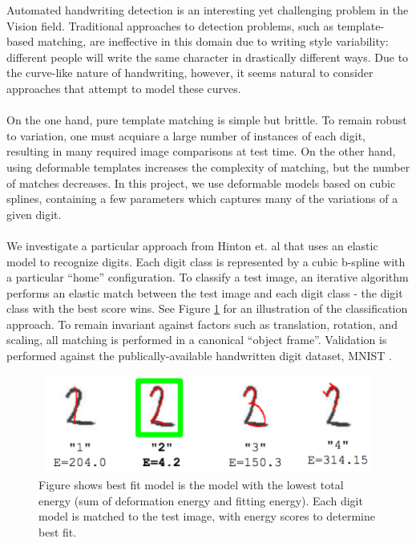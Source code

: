 \documentclass[oribibl]{llncs}
\begin{document}
Automated handwriting detection is an interesting yet challenging problem in the Vision field. Traditional approaches to detection problems, such as template-based matching, are ineffective in this domain due to writing style variability: different people will write the same character in drastically different ways. Due to the curve-like nature of handwriting, however, it seems natural to consider approaches that attempt to model these curves.  
\\
\\
On the one hand, pure template matching is simple but brittle. To remain robust to variation, one must acquiare a large number of instances of each digit, resulting in many required image comparisons at test time.
On the other hand, using deformable templates increases the complexity of matching, but the number of matches decreases. In this project, we use deformable models based on cubic splines, containing a few parameters which captures many of the variations of a given digit. 
\\
\\
We investigate a particular approach from Hinton et. al \cite{Hinton92adaptiveelastic} that uses an elastic model to recognize digits. Each digit class is represented by a cubic b-spline with a particular ``home'' configuration. To classify a test image, an iterative algorithm  performs an elastic match between the test image and each digit class - the digit class with the best score wins. See Figure \ref{fig:bestFitEg} for an illustration of the classification approach. To remain invariant against factors such as translation, rotation, and scaling, all matching is performed in a canonical ``object frame''. Validation is performed against the publically-available handwritten digit dataset, MNIST \cite{mnist}.

\begin{figure}
\centering
\includegraphics[height=3.25cm , width=12cm ]{bestFitEg}
\caption[]{Figure shows best fit model is the model with the lowest total energy (sum of deformation energy and fitting energy). Each digit model is matched to the test image, with energy scores to determine best fit.} 
\label{fig:bestFitEg}
\end{figure}
\end{document}
